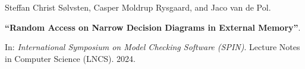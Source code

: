 Steffan Christ Sølvsten, Casper Moldrup Rysgaard, and Jaco van de Pol.

{\bf ``Random Access on Narrow Decision Diagrams in External Memory''}.

In: \emph{International Symposium on Model Checking Software (SPIN)}.
Lecture Notes in Computer Science (LNCS). 2024.

\label{cite:2024.spin}